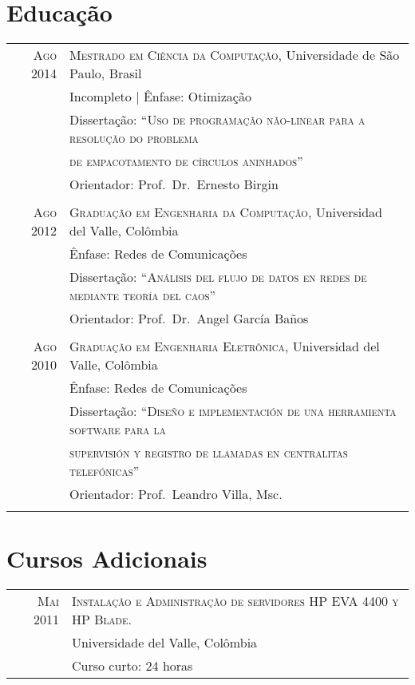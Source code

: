 \documentclass[a4paper,10pt]{article}
\begin{document}
\section{Educação}
\begin{tabular}{rl}	

  \textsc{Ago 2014} & \textsc{Mestrado em Ciência da Computação}, Universidade de São Paulo, Brasil \\
                    & Incompleto | Ênfase: Otimização \\
                    & Dissertação: ``\textsc{Uso de programação não-linear para a resolução do problema}\\
                    & \textsc{de empacotamento de círculos aninhados}'' \\
                    & Orientador: Prof.~Dr.~Ernesto Birgin \\
                    &\\

  \textsc{Ago 2012} & \textsc{Graduação em Engenharia da Computação}, Universidad del Valle, Colômbia \\
                    & Ênfase: Redes de Comunicações \\
                    & Dissertação: ``\textsc{Análisis del flujo de datos en redes de mediante teoría del caos}'' \\
                    & Orientador: Prof.~Dr.~Angel García Baños \\
                    &\\

  \textsc{Ago 2010} & \textsc{Graduação em Engenharia Eletrônica}, Universidad del Valle, Colômbia \\
                    & Ênfase: Redes de Comunicações \\
                    & Dissertação: ``\textsc{Diseño e implementación de una herramienta software para la} \\
                    & \textsc{supervisión y registro de llamadas en centralitas telefónicas}'' \\
                    & Orientador: Prof.~Leandro Villa, Msc. \\
                    &\\

\end{tabular}

\section{Cursos Adicionais}
\begin{tabular}{rl}	

  \textsc{Mai 2011} & \textsc{Instalação e Administração de servidores HP EVA 4400 y HP Blade.} \\
                    & Universidade del Valle, Colômbia \\
                    & Curso curto: 24 horas \\

\end{tabular}
\end{document}
